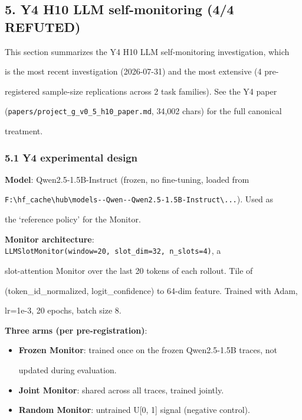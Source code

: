 \documentclass[
]{article}
\begin{document}
\subsection{5. Y4 H10 LLM self-monitoring (4/4
REFUTED)}\label{y4-h10-llm-self-monitoring-44-refuted}

This section summarizes the Y4 H10 LLM self-monitoring investigation,
which

is the most recent investigation (2026-07-31) and the most extensive (4
pre-

registered sample-size replications across 2 task families). See the Y4
paper

(\texttt{papers/project\_g\_v0\_5\_h10\_paper.md}, 34,002 chars) for the
full canonical

treatment.

\subsubsection{5.1 Y4 experimental design}\label{y4-experimental-design}

\textbf{Model}: Qwen2.5-1.5B-Instruct (frozen, no fine-tuning, loaded
from

\texttt{F:\textbackslash{}hf\_cache\textbackslash{}hub\textbackslash{}models-\/-Qwen-\/-Qwen2.5-1.5B-Instruct\textbackslash{}...}).
Used as

the `reference policy' for the Monitor.

\textbf{Monitor architecture}:
\texttt{LLMSlotMonitor(window=20,\ slot\_dim=32,\ n\_slots=4)}, a

slot-attention Monitor over the last 20 tokens of each rollout. Tile of

(token\_id\_normalized, logit\_confidence) to 64-dim feature. Trained
with Adam,

lr=1e-3, 20 epochs, batch size 8.

\textbf{Three arms (per pre-registration)}:

\begin{itemize}
\item
  \textbf{Frozen Monitor}: trained once on the frozen Qwen2.5-1.5B
  traces, not

  updated during evaluation.
\item
  \textbf{Joint Monitor}: shared across all traces, trained jointly.
\item
  \textbf{Random Monitor}: untrained U{[}0, 1{]} signal (negative
  control).
\end{itemize}
\end{document}
